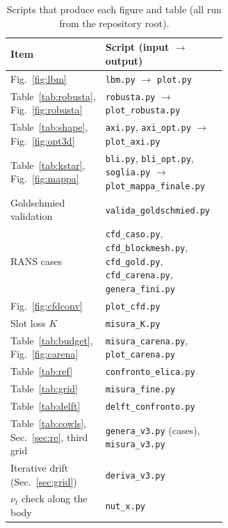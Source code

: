 \documentclass[11pt,a4paper]{article}
\begin{document}
\begin{table}[h]\centering
\caption{Scripts that produce each figure and table (all run from the repository root).}
\label{tab:files}
\begin{tabular}{lp{0.62\linewidth}}
\toprule
Item & Script (input $\rightarrow$ output)\\
\midrule
Fig.~\ref{fig:lbm} & \texttt{lbm.py} $\rightarrow$ \texttt{plot.py}\\
Table~\ref{tab:robusta}, Fig.~\ref{fig:robusta} & \texttt{robusta.py} $\rightarrow$ \texttt{plot\_robusta.py}\\
Table~\ref{tab:shape}, Fig.~\ref{fig:opt3d} & \texttt{axi.py}, \texttt{axi\_opt.py} $\rightarrow$ \texttt{plot\_axi.py}\\
Table~\ref{tab:kstar}, Fig.~\ref{fig:mappa} & \texttt{bli.py}, \texttt{bli\_opt.py}, \texttt{soglia.py} $\rightarrow$ \texttt{plot\_mappa\_finale.py}\\
Goldschmied validation & \texttt{valida\_goldschmied.py}\\
RANS cases & \texttt{cfd\_caso.py}, \texttt{cfd\_blockmesh.py}, \texttt{cfd\_gold.py}, \texttt{cfd\_carena.py}, \texttt{genera\_fini.py}\\
Fig.~\ref{fig:cfdconv} & \texttt{plot\_cfd.py}\\
Slot loss $K$ & \texttt{misura\_K.py}\\
Table~\ref{tab:budget}, Fig.~\ref{fig:carena} & \texttt{misura\_carena.py}, \texttt{plot\_carena.py}\\
Table~\ref{tab:ref} & \texttt{confronto\_elica.py}\\
Table~\ref{tab:grid} & \texttt{misura\_fine.py}\\
Table~\ref{tab:delft} & \texttt{delft\_confronto.py}\\
Table~\ref{tab:cowls}, Sec.~\ref{sec:re}, third grid & \texttt{genera\_v3.py} (cases), \texttt{misura\_v3.py}\\
Iterative drift (Sec.~\ref{sec:grid}) & \texttt{deriva\_v3.py}\\
$\nu_t$ check along the body & \texttt{nut\_x.py}\\
\bottomrule
\end{tabular}
\end{table}
\end{document}

